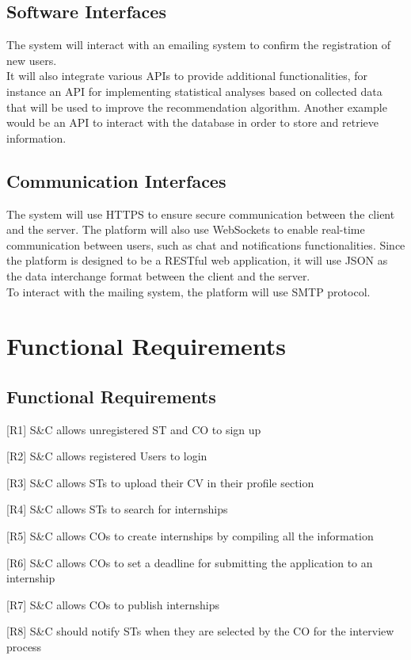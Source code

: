 \subsection{Software Interfaces}
The system will interact with an emailing system to confirm the registration of new users. \\
It will also integrate various APIs to provide additional functionalities, for instance an API for implementing statistical analyses 
based on collected data that will be used to improve the recommendation algorithm. Another example would be an API to interact with
the database in order to store and retrieve information.


\subsection{Communication Interfaces}
The system will use HTTPS to ensure secure communication between the client and the server. The platform will also use WebSockets to
enable real-time communication between users, such as chat and notifications functionalities. Since the platform is designed to be a 
RESTful web application, it will use JSON as the data interchange format between the client and the server. \\
To interact with the mailing system, the platform will use SMTP protocol.


\section{Functional Requirements}
\subsection{Functional Requirements}
[R1] S\&C allows unregistered ST and CO to sign up

[R2] S\&C allows registered Users to login	

[R3] S\&C allows STs to upload their CV in their profile section

[R4] S\&C allows STs to search for internships

[R5] S\&C allows COs to create internships by compiling all the information

[R6] S\&C allows COs to set a deadline for submitting the application to an internship

[R7] S\&C allows COs to publish internships

[R8] S\&C should notify STs when they are selected by the CO for the interview process

